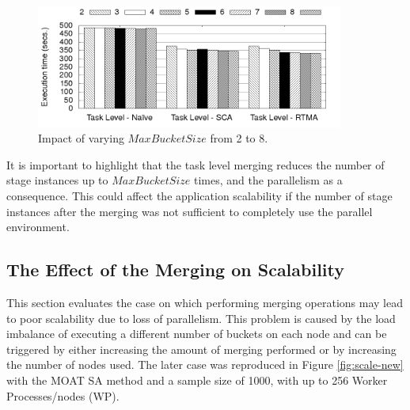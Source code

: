 \begin{figure}[h!]
\begin{center}
	\includegraphics[width=0.9\textwidth]{img/mbs}
	\caption{Impact of varying $MaxBucketSize$ from 2 to 8.}
	\label{fig:mbs}
\end{center}
\vspace*{-3ex}
\end{figure}

It is important to highlight that the task level merging reduces the number of stage
instances up to $MaxBucketSize$ times, and the parallelism as a consequence. This
could affect the application scalability if the number of stage instances after
the merging was not sufficient to completely use the parallel environment.


\subsection{The Effect of the Merging on Scalability}
\label{sec:scale}

This section evaluates the case on which performing merging operations may lead to poor scalability due to loss of parallelism. This problem is caused by the load imbalance of executing a different number of buckets on each node and can be triggered by either increasing the amount of merging performed or by increasing the number of nodes used. The later case was reproduced in Figure \ref{fig:scale-new} with the MOAT SA method and a sample size of 1000, with up to 256 Worker Processes/nodes (WP). 

